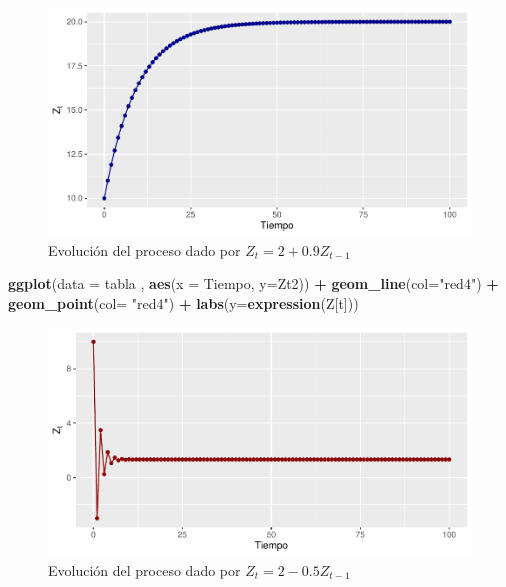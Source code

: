 \documentclass[
]{book}
\newenvironment{Shaded}{\begin{snugshade}}{\end{snugshade}}
\newcommand{\AttributeTok}[1]{\textcolor[rgb]{0.13,0.29,0.53}{#1}}
\newcommand{\FunctionTok}[1]{\textcolor[rgb]{0.13,0.29,0.53}{\textbf{#1}}}
\newcommand{\NormalTok}[1]{#1}
\newcommand{\SpecialCharTok}[1]{\textcolor[rgb]{0.81,0.36,0.00}{\textbf{#1}}}
\newcommand{\StringTok}[1]{\textcolor[rgb]{0.31,0.60,0.02}{#1}}
\begin{document}
\begin{figure}

{\centering \includegraphics{Notas-Series-Tiempo_files/figure-latex/fig21-1} 

}

\caption{Evolución del proceso dado por $Z_t =2+0.9Z_{t-1}$}\label{fig:fig21}
\end{figure}

\begin{Shaded}
\begin{Highlighting}[]
\FunctionTok{ggplot}\NormalTok{(}\AttributeTok{data =}\NormalTok{ tabla , }\FunctionTok{aes}\NormalTok{(}\AttributeTok{x =}\NormalTok{ Tiempo, }\AttributeTok{y=}\NormalTok{Zt2)) }\SpecialCharTok{+}
  \FunctionTok{geom\_line}\NormalTok{(}\AttributeTok{col=}\StringTok{"red4"}\NormalTok{) }\SpecialCharTok{+}
  \FunctionTok{geom\_point}\NormalTok{(}\AttributeTok{col=} \StringTok{"red4"}\NormalTok{) }\SpecialCharTok{+}
  \FunctionTok{labs}\NormalTok{(}\AttributeTok{y=}\FunctionTok{expression}\NormalTok{(Z[t]))}
\end{Highlighting}
\end{Shaded}

\begin{figure}

{\centering \includegraphics{Notas-Series-Tiempo_files/figure-latex/fig22-1} 

}

\caption{Evolución del proceso dado por $Z_t =2-0.5Z_{t-1}$}\label{fig:fig22}
\end{figure}
\end{document}
